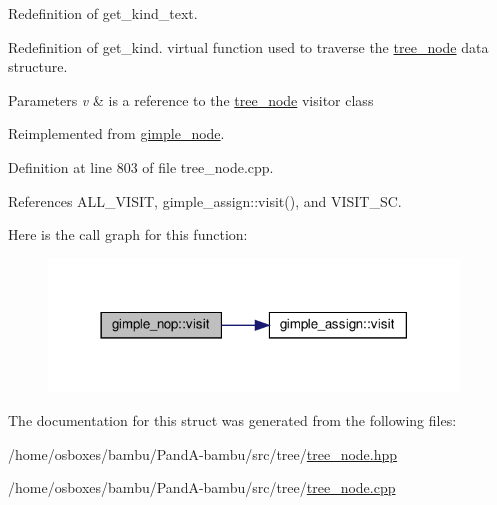 Redefinition of get\+\_\+kind\+\_\+text. 

Redefinition of get\+\_\+kind. virtual function used to traverse the \hyperlink{classtree__node}{tree\+\_\+node} data structure. 
\begin{DoxyParams}{Parameters}
{\em v} & is a reference to the \hyperlink{classtree__node}{tree\+\_\+node} visitor class \\
\hline
\end{DoxyParams}


Reimplemented from \hyperlink{structgimple__node_a337b029a3aca9c1b96311b6e6668f7f3}{gimple\+\_\+node}.



Definition at line 803 of file tree\+\_\+node.\+cpp.



References A\+L\+L\+\_\+\+V\+I\+S\+IT, gimple\+\_\+assign\+::visit(), and V\+I\+S\+I\+T\+\_\+\+SC.

Here is the call graph for this function\+:
\nopagebreak
\begin{figure}[H]
\begin{center}
\leavevmode
\includegraphics[width=309pt]{db/d28/structgimple__nop_a332a68c582fd619f0fc2807fd90703d8_cgraph}
\end{center}
\end{figure}


The documentation for this struct was generated from the following files\+:\begin{DoxyCompactItemize}
\item 
/home/osboxes/bambu/\+Pand\+A-\/bambu/src/tree/\hyperlink{tree__node_8hpp}{tree\+\_\+node.\+hpp}\item 
/home/osboxes/bambu/\+Pand\+A-\/bambu/src/tree/\hyperlink{tree__node_8cpp}{tree\+\_\+node.\+cpp}\end{DoxyCompactItemize}
